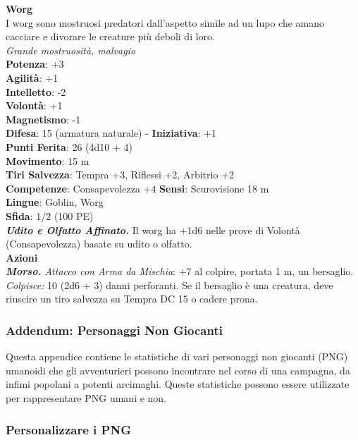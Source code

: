\begin{multicols}{2}
\medskip\textbf{Worg}\\
I worg sono mostruosi predatori dall'aspetto simile ad un lupo che amano cacciare e divorare le creature più deboli di loro.\\
\emph{Grande mostruosità, malvagio}\\
\textbf{Potenza}: +3\\
\textbf{Agilità}: +1\\
\textbf{Intelletto}: -2\\
\textbf{Volontà}: +1\\
\textbf{Magnetismo}: -1\\
\textbf{Difesa}: 15 (armatura naturale) - \textbf{Iniziativa}: +1\\
\textbf{Punti Ferita}: 26 (4d10 + 4)\\
\textbf{Movimento}: 15 m\\
\textbf{Tiri Salvezza}: Tempra +3, Riflessi +2, Arbitrio +2 \\
\textbf{Competenze}: Consapevolezza +4
\textbf{Sensi}: Scurovisione 18 m\\
\textbf{Lingue}: Goblin, Worg\\
\textbf{Sfida}: 1/2 (100 PE)\smallskip\\
\emph{\textbf{Udito e Olfatto Affinato.}} Il worg ha +1d6 nelle prove di Volontà (Consapevolezza) basate su udito o olfatto.\\
\smallskip\textbf{Azioni}\\
\emph{\textbf{Morso.} Attacco con Arma da Mischia}: +7 al colpire, portata 1 m, un bersaglio.\\
\emph{Colpisce:} 10 (2d6 + 3) danni perforanti. Se il bersaglio è una creatura, deve riuscire un tiro salvezza su Tempra DC  15 o cadere prona. 

\pagebreak

\subsubsection{Addendum: Personaggi Non Giocanti}

Questa appendice contiene le statistiche di vari personaggi non giocanti (PNG) umanoidi che gli avventurieri possono incontrare nel corso di una campagna, da infimi popolani a potenti arcimaghi. Queste statistiche possono essere utilizzate per rappresentare PNG umani e non.\\

\subsubsection{Personalizzare i PNG}


\end{multicols}
